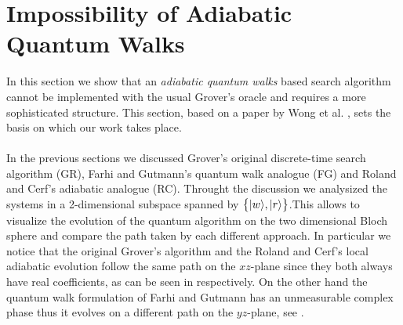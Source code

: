 \section{Impossibility of Adiabatic Quantum Walks}
In this section we show that an \textit{adiabatic quantum walks} based search algorithm cannot be implemented with the usual Grover's oracle and requires a more sophisticated structure. This section, based on a paper by Wong et al. \cite{Wong2016}, sets the basis on which our work takes place. \\ \\
In the previous sections we discussed Grover's original discrete-time search algorithm (GR), Farhi and Gutmann's quantum walk analogue (FG) and Roland and Cerf's adiabatic analogue (RC). Throught the discussion we analysized the systems in a 2-dimensional subspace spanned by $\big\{{|{w}\rangle}, {|{r}\rangle}\big\}$.This allows to visualize the evolution of the quantum algorithm on the two dimensional Bloch sphere and compare the path taken by each different approach. In particular we notice that the original Grover's algorithm and the Roland and Cerf's local adiabatic evolution follow the same path on the $xz$-plane since they both always have real coefficients, as can be seen in  respectively. On the other hand the quantum walk formulation of Farhi and Gutmann has an unmeasurable complex phase thus it evolves on a different path on the $yz$-plane, see .
